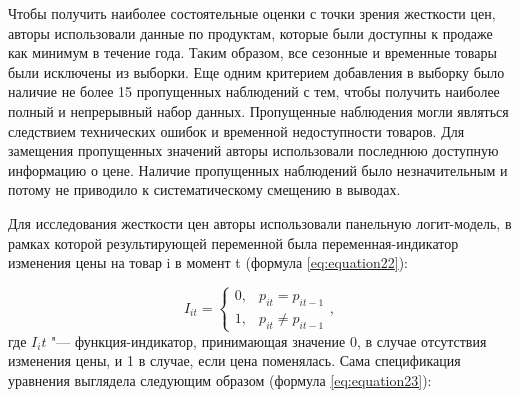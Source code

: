 Чтобы получить наиболее состоятельные оценки с точки зрения жесткости цен, авторы использовали данные по продуктам, которые были доступны к продаже как минимум в течение года. Таким образом, все сезонные и временные товары были исключены из выборки. Еще одним критерием добавления в выборку было наличие не более 15 пропущенных наблюдений с тем, чтобы получить наиболее полный и непрерывный набор данных. Пропущенные наблюдения могли являться следствием технических ошибок и временной недоступности товаров. Для замещения пропущенных значений авторы использовали последнюю доступную информацию о цене. Наличие пропущенных наблюдений было незначительным и потому не приводило к систематическому смещению в выводах.

Для исследования жесткости цен авторы использовали панельную логит-модель, в рамках которой результирующей переменной была переменная-индикатор изменения цены на товар i в момент t (формула \eqref{eq:equation22}):

\begin{equation}
	\label{eq:equation22}
	I_{it} =
	\begin{cases} 
		0, & p_{it} = p_{it-1} \\ 
		1, & p_{it} \neq p_{it-1} 
	\end{cases},
\end{equation}
где \( I_it \) "--- функция-индикатор, принимающая значение 0, в случае отсутствия изменения цены, и 1 в случае, если цена поменялась. Сама спецификация уравнения выглядела следующим образом (формула \eqref{eq:equation23}):


